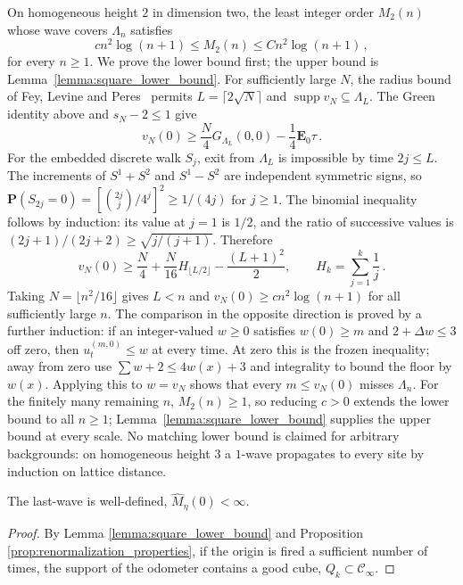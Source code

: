 \documentclass[12pt]{amsart}
\begin{document}
\begin{remark}\label{rem:sharp_planar_obstruction}
On homogeneous height $2$ in dimension two, the least integer order $M_2(n)$ whose wave covers $\Lambda_n$ satisfies
\begin{equation*}
 c n^2\log(n+1)\leq M_2(n)\leq C n^2\log(n+1)\,,
\end{equation*}
for every $n\geq1$.
We prove the lower bound first; the upper bound is Lemma~\ref{lemma:square_lower_bound}.
For sufficiently large $N$, the radius bound of Fey, Levine and Peres~\cite{fey2010growth} permits $L=\lceil2\sqrt N\rceil$ and $\operatorname{supp}v_N\subseteq\Lambda_L$.
The Green identity above and $s_N-2\leq1$ give
\begin{equation*}
 v_N(0)\geq\frac N4G_{\Lambda_L}(0,0)-\frac14\mathbf E_0\tau\,.
\end{equation*}
For the embedded discrete walk $S_j$, exit from $\Lambda_L$ is impossible by time $2j\leq L$. The increments of $S^1+S^2$ and $S^1-S^2$ are independent symmetric signs, so $\mathbf P(S_{2j}=0)=[\binom{2j}j/4^j]^2\geq1/(4j)$ for $j\geq1$. The binomial inequality follows by induction: its value at $j=1$ is $1/2$, and the ratio of successive values is $(2j+1)/(2j+2)\geq\sqrt{j/(j+1)}$. Therefore
\begin{equation*}
 v_N(0)\geq\frac N4+\frac N{16}H_{\lfloor L/2\rfloor}
                   -\frac{(L+1)^2}{2},\qquad H_k=\sum_{j=1}^k\frac1j\,.
\end{equation*}
Taking $N=\lfloor n^2/16\rfloor$ gives $L<n$ and $v_N(0)\geq c n^2\log(n+1)$ for all sufficiently large $n$.
The comparison in the opposite direction is proved by a further induction: if an integer-valued $w\geq0$ satisfies $w(0)\geq m$ and $2+\Delta w\leq3$ off zero, then $u_t^{(m,0)}\leq w$ at every time. At zero this is the frozen inequality; away from zero use $\sum w+2\leq4w(x)+3$ and integrality to bound the floor by $w(x)$. Applying this to $w=v_N$ shows that every $m\leq v_N(0)$ misses $\Lambda_n$. For the finitely many remaining $n$, $M_2(n)\geq1$, so reducing $c>0$ extends the lower bound to all $n\geq1$; Lemma~\ref{lemma:square_lower_bound} supplies the upper bound at every scale. No matching lower bound is claimed for arbitrary backgrounds: on homogeneous height $3$ a $1$-wave propagates to every site by induction on lattice distance.
\end{remark}





\begin{lemma} \label{lemma:finite_exploding}
	The last-wave is well-defined, $\hat{M}_{\eta}(0) < \infty$.
\end{lemma}
\begin{proof}
	By Lemma \ref{lemma:square_lower_bound}
	and Proposition \ref{prop:renormalization_properties}, if the origin is fired a sufficient number of times, the support of the odometer contains a good cube, $Q_k \subset \mathcal{C}_{\infty}$.
\end{proof}
\end{document}
